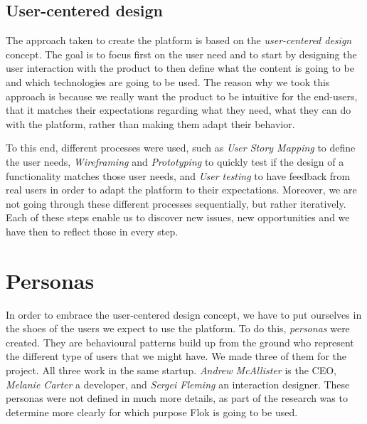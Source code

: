 \documentclass[a4paper,12pt, oneside]{article}
\begin{document}
\subsection{User-centered design}
The approach taken to create the platform is based on the \emph{user-centered design} concept.
The goal is to focus first on the user need and to start by designing the user interaction with the product to then define what the content is going to be and which technologies are going to be used.
The reason why we took this approach is because we really want the product to be intuitive for the end-users, that it matches their expectations regarding what they need, what they can do with the platform, rather than making them adapt their behavior.

To this end, different processes were used, such as \emph{User Story Mapping} to define the user needs, \emph{Wireframing} and \emph{Prototyping} to quickly test if the design of a functionality matches those user needs, and \emph{User testing} to have feedback from real users in order to adapt the platform to their expectations.
Moreover, we are not going through these different processes sequentially, but rather iteratively.
Each of these steps enable us to discover new issues, new opportunities and we have then to reflect those in every step.


\section{Personas}
In order to embrace the user-centered design concept, we have to put ourselves in the shoes of the users we expect to use the platform. To do this, \emph{personas} were created.
They are behavioural patterns build up from the ground who represent the different type of users that we might have.
We made three of them for the project.
All three work in the same startup. \emph{Andrew McAllister} is the CEO, \emph{Melanie Carter} a developer, and \emph{Sergei Fleming} an interaction designer.
These personas were not defined in much more details, as part of the research was to determine more clearly for which purpose Flok is going to be used.
\end{document}
